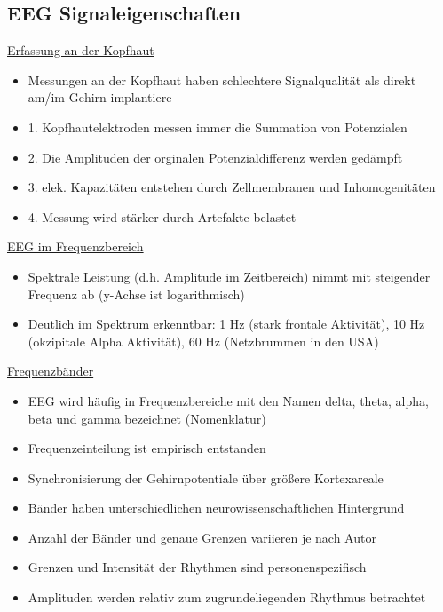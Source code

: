 \documentclass[a4paper,10pt,oneside]{article}
\begin{document}
\subsection{EEG Signaleigenschaften}

\underline{Erfassung an der Kopfhaut} \\
	\begin{itemize}
		\item Messungen an der Kopfhaut haben schlechtere Signalqualität als direkt am/im Gehirn implantiere 
		\item 1. Kopfhautelektroden messen immer die Summation von Potenzialen
		\item 2. Die Amplituden der orginalen Potenzialdifferenz werden gedämpft 
		\item 3. elek. Kapazitäten entstehen durch Zellmembranen und Inhomogenitäten
		\item 4. Messung wird stärker durch Artefakte belastet
	\end{itemize}
	
\underline{EEG im Frequenzbereich} \\
	\begin{itemize}
		\item Spektrale Leistung (d.h. Amplitude im Zeitbereich) nimmt mit steigender Frequenz ab (y-Achse ist logarithmisch) 
		\item Deutlich im Spektrum erkenntbar: 1 Hz (stark frontale Aktivität), 10 Hz (okzipitale Alpha Aktivität), 60 Hz (Netzbrummen in den USA)
	\end{itemize}
 
\underline{Frequenzbänder} \\	
	\begin{itemize}
		\item EEG wird häufig in Frequenzbereiche mit den Namen delta, theta, alpha, beta und gamma bezeichnet (Nomenklatur)
		\item Frequenzeinteilung ist empirisch entstanden
		\item Synchronisierung der Gehirnpotentiale über größere Kortexareale
		\item Bänder haben unterschiedlichen neurowissenschaftlichen Hintergrund
		\item Anzahl der Bänder und genaue Grenzen variieren je nach Autor
		\item Grenzen und Intensität der Rhythmen sind personenspezifisch 
		\item Amplituden werden relativ zum zugrundeliegenden Rhythmus betrachtet
	\end{itemize}
	
\end{document}
